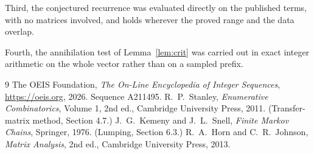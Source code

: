 \documentclass[11pt,a4paper]{article}
\theoremstyle{plain}
\theoremstyle{definition}
\begin{document}
Third, the conjectured recurrence was evaluated directly on the published terms, with no
matrices involved, and holds wherever the proved range and the data overlap.

Fourth, the annihilation test of Lemma~\ref{lem:crit} was carried out in exact integer
arithmetic on the whole vector rather than on a sampled prefix.

\begin{thebibliography}{9}
 The OEIS Foundation, \emph{The On-Line Encyclopedia of Integer
Sequences}, \url{https://oeis.org}, 2026. Sequence A211495.
 R.~P.~Stanley, \emph{Enumerative Combinatorics}, Volume 1, 2nd ed.,
Cambridge University Press, 2011. (Transfer-matrix method, Section 4.7.)
 J.~G.~Kemeny and J.~L.~Snell, \emph{Finite Markov Chains}, Springer, 1976.
(Lumping, Section 6.3.)
 R.~A.~Horn and C.~R.~Johnson, \emph{Matrix Analysis}, 2nd ed., Cambridge
University Press, 2013.
\end{thebibliography}
\end{document}
